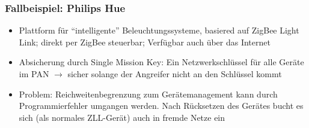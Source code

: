 \subsubsection{Fallbeispiel: Philips Hue}
\begin{itemize}
	\item Plattform für "`intelligente"' Beleuchtungssysteme, basiered auf ZigBee Light Link; direkt per ZigBee steuerbar; Verfügbar auch über das Internet
	\item Absicherung durch Single Mission Key: Ein Netzwerkschlüssel für alle Geräte im PAN \(\rightarrow\) sicher solange der Angreifer nicht an den Schlüssel kommt
	\item Problem: Reichweitenbegrenzung zum Gerätemanagement kann durch Programmierfehler umgangen werden. Nach Rücksetzen des Gerätes bucht es sich (als normales ZLL-Gerät) auch in fremde Netze ein
\end{itemize}


